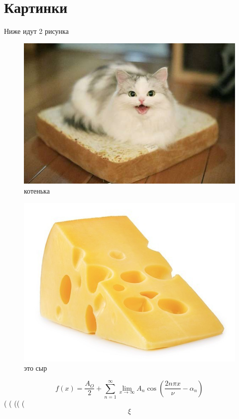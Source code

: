\documentclass{article}
\begin{document}
\newpage
\section{Картинки}
Ниже идут 2 рисунка
\begin{figure}[h!]
    \centering
    \includegraphics[scale=0.5]{cat.jpg}
    \caption{котенька}
    \label{fig:my_label}
\end{figure}
\begin{figure}[h!]
    \centering
    \includegraphics[scale=0.5]{cyr.jpg}
    \caption{это сыр}
    \label{fig:my_label}
\end{figure}

\newpage
\begin{equation}
    f(x) = \frac{A_O}{2} + \sum_{n=1}^{\infty}\lim_{x\to\infty} A_n \cos \left(\frac{2n \pi x}{\nu}-\alpha_n \right)
\end{equation}
( \big( \Big(\bigg( \Bigg( $$\xi$$
\end{document}
